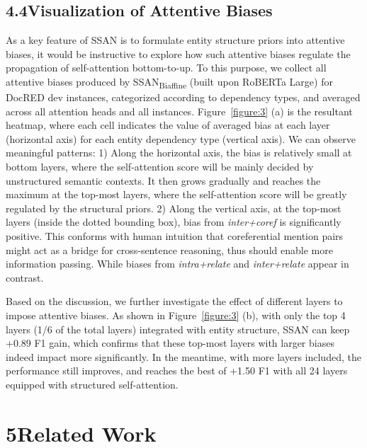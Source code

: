 \documentclass[letterpaper]{article} \usepackage{aaai21}  \usepackage{times}  \usepackage{helvet} \usepackage{courier}  \usepackage[hyphens]{url}  \usepackage{graphicx} \usepackage{booktabs}
\begin{document}
\subsection{4.4\quad Visualization of Attentive Biases}
As a key feature of SSAN is to formulate entity structure priors into attentive biases, it would be instructive to explore how such attentive biases regulate the propagation of self-attention bottom-to-up.
To this purpose, we collect all attentive biases produced by SSAN\textsubscript{Biaffine} (built upon RoBERTa Large) for DocRED dev instances, categorized according to dependency types, and averaged across all attention heads and all instances.
Figure~\ref{figure:3} (a) is the resultant heatmap, where each cell indicates the value of averaged bias at each layer (horizontal axis) for each entity dependency type (vertical axis).
We can observe meaningful patterns:
1) Along the horizontal axis, the bias is relatively small at bottom layers, where the self-attention score will be mainly decided by unstructured semantic contexts. It then grows gradually and reaches the maximum at the top-most layers, where the self-attention score will be greatly regulated by the structural priors.
2) Along the vertical axis, at the top-most layers (inside the dotted bounding box), bias from \textit{inter+coref} is significantly positive. This conforms with human intuition that coreferential mention pairs might act as a bridge for cross-sentence reasoning, thus should enable more information passing. While biases from \textit{intra+relate} and \textit{inter+relate} appear in contrast.


Based on the discussion, we further investigate the effect of different layers to impose attentive biases. As shown in Figure~\ref{figure:3} (b), with only the top 4 layers (1/6 of the total layers) integrated with entity structure, SSAN can keep +0.89 F1 gain, which confirms that these top-most layers with larger biases indeed impact more significantly. In the meantime, with more layers included, the performance still improves, and reaches the best of +1.50 F1 with all 24 layers equipped with structured self-attention.

\section{5\quad Related Work}
\end{document}

